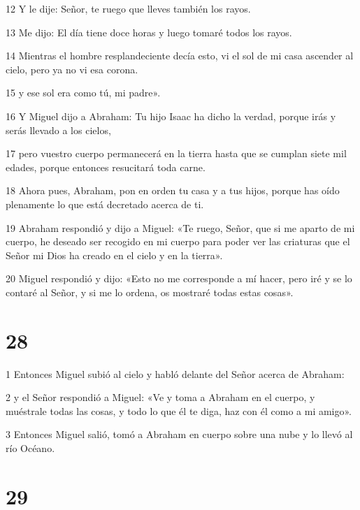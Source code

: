 \par 12 Y le dije: Señor, te ruego que lleves también los rayos.

\par 13 Me dijo: El día tiene doce horas y luego tomaré todos los rayos.

\par 14 Mientras el hombre resplandeciente decía esto, vi el sol de mi casa ascender al cielo, pero ya no vi esa corona.

\par 15 y ese sol era como tú, mi padre».

\par 16 Y Miguel dijo a Abraham: Tu hijo Isaac ha dicho la verdad, porque irás y serás llevado a los cielos,

\par 17 pero vuestro cuerpo permanecerá en la tierra hasta que se cumplan siete mil edades, porque entonces resucitará toda carne.

\par 18 Ahora pues, Abraham, pon en orden tu casa y a tus hijos, porque has oído plenamente lo que está decretado acerca de ti.

\par 19 Abraham respondió y dijo a Miguel: «Te ruego, Señor, que si me aparto de mi cuerpo, he deseado ser recogido en mi cuerpo para poder ver las criaturas que el Señor mi Dios ha creado en el cielo y en la tierra».

\par 20 Miguel respondió y dijo: «Esto no me corresponde a mí hacer, pero iré y se lo contaré al Señor, y si me lo ordena, os mostraré todas estas cosas».

\chapter{28}

\par 1 Entonces Miguel subió al cielo y habló delante del Señor acerca de Abraham:

\par 2 y el Señor respondió a Miguel: «Ve y toma a Abraham en el cuerpo, y muéstrale todas las cosas, y todo lo que él te diga, haz con él como a mi amigo».

\par 3 Entonces Miguel salió, tomó a Abraham en cuerpo sobre una nube y lo llevó al río Océano.

\chapter{29}

